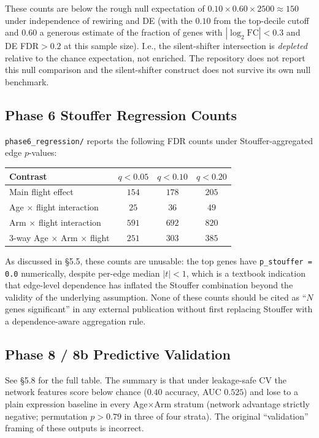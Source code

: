 \documentclass[11pt]{article}
\newcommand{\code}[1]{\texttt{#1}}
\begin{document}
\noindent These counts are below the rough null expectation of $0.10\times 0.60\times 2500 \approx 150$ under independence of rewiring and DE (with the $0.10$ from the top-decile cutoff and $0.60$ a generous estimate of the fraction of genes with $|\log_2\mathrm{FC}|<0.3$ and DE FDR$>0.2$ at this sample size). I.e., the silent-shifter intersection is \emph{depleted} relative to the chance expectation, not enriched. The repository does not report this null comparison and the silent-shifter construct does not survive its own null benchmark.

\subsection{Phase 6 Stouffer Regression Counts}

\code{phase6\_regression/} reports the following FDR counts under Stouffer-aggregated edge $p$-values:

\begin{center}
\small
\begin{tabular}{lccc}
\toprule
Contrast & $q < 0.05$ & $q < 0.10$ & $q < 0.20$ \\
\midrule
Main flight effect & $154$ & $178$ & $205$ \\
Age $\times$ flight interaction & $25$ & $36$ & $49$ \\
Arm $\times$ flight interaction & $591$ & $692$ & $820$ \\
3-way Age $\times$ Arm $\times$ flight & $251$ & $303$ & $385$ \\
\bottomrule
\end{tabular}
\end{center}

\noindent As discussed in \S 5.5, these counts are unusable: the top genes have \code{p\_stouffer = 0.0} numerically, despite per-edge median $|t|<1$, which is a textbook indication that edge-level dependence has inflated the Stouffer combination beyond the validity of the underlying assumption. None of these counts should be cited as ``$N$ genes significant'' in any external publication without first replacing Stouffer with a dependence-aware aggregation rule.

\subsection{Phase 8 / 8b Predictive Validation}

See \S 5.8 for the full table. The summary is that under leakage-safe CV the network features score below chance ($0.40$ accuracy, AUC $0.525$) and lose to a plain expression baseline in every Age$\times$Arm stratum (network advantage strictly negative; permutation $p > 0.79$ in three of four strata). The original ``validation'' framing of these outputs is incorrect.
\end{document}

